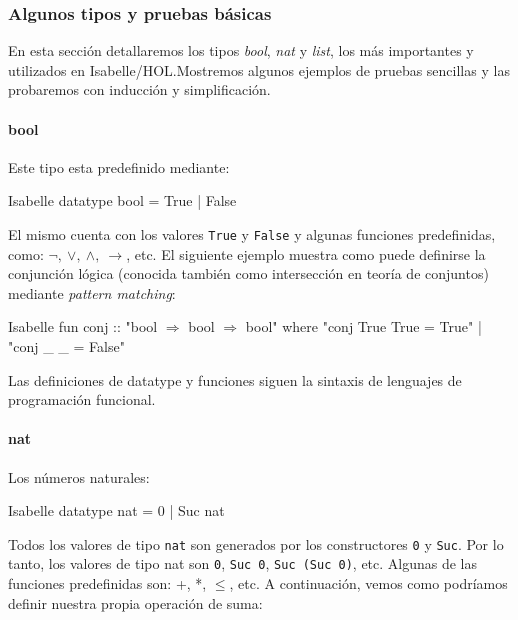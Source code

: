 \documentclass[12pt]{book}
\begin{document}
\subsubsection{Algunos tipos y pruebas básicas}

En esta sección detallaremos los tipos \textit{bool}, \textit{nat} y \textit{list}, los más importantes y utilizados en Isabelle/HOL.\@ Mostremos algunos ejemplos de pruebas sencillas y las probaremos con inducción y simplificación.

\paragraph{bool}

Este tipo esta predefinido mediante:

\begin{code}[title=Tipo de dato \textit{bool}]{Isabelle}
datatype bool = True | False
\end{code}

El mismo cuenta con los valores \texttt{True} y \texttt{False} y algunas funciones predefinidas,\\ como:  $\neg,\ \vee,\ \wedge,\ \rightarrow$, etc. El siguiente ejemplo muestra como puede definirse la conjunción lógica (conocida también como intersección en teoría de conjuntos) mediante \textit{pattern matching}:

\begin{code}[title=Definición de la función \textit{conjunción lógica} (también conocida como \textit{and})]{Isabelle}
  fun conj :: "bool $\Rightarrow$ bool $\Rightarrow$ bool" where
  "conj True True = True" |
  "conj _ _ = False"
\end{code}

Las definiciones de datatype y funciones siguen la sintaxis de lenguajes de programación funcional.

\paragraph{nat}

Los números naturales:


\begin{code}[title=Tipo de dato que representa los números naturales.]{Isabelle}
datatype nat = 0 | Suc nat
\end{code}

Todos los valores de tipo \texttt{nat} son generados por los constructores \texttt{0} y \texttt{Suc}. Por lo tanto, los valores de tipo nat son \texttt{0}, \texttt{Suc 0}, \texttt{Suc (Suc 0)}, etc. Algunas de las funciones predefinidas son: +, *, $\leq$, etc. A continuación, vemos como podríamos definir nuestra propia operación de suma:
\end{document}
